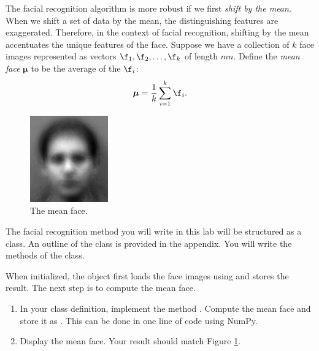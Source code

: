 The facial recognition algorithm is more robust if we first \emph{shift by the mean}. When we shift a set of data by the mean, the distinguishing features are exaggerated. Therefore, in the context of facial recognition, shifting by the mean accentuates the unique features of the face.
Suppose we have a collection of $k$ face images represented as vectors $\f_1, \f_2, \ldots, \f_k$ of length $mn$.
Define the \emph{mean face} ${\boldsymbol \mu}$ to be the average of the $\f_i$:
\[
{\boldsymbol \mu} = \frac{1}{k}\sum_{i=1}^k \f_i.
\]
\begin{figure}
\includegraphics[width=0.3\textwidth]{meanFace.png}
\caption{The mean face.}
\label{facialRecognition:meanFace}
\end{figure}

\begin{problem}
\label{prob:meanFace}
\leavevmode

The facial recognition method you will write in this lab will be structured as a class. 
An outline of the  class is provided in the appendix. %
You will write the methods of the class.

When initialized, the  object first loads the face images using  and stores the result.
The next step is to compute the mean face.
\begin{enumerate}
\item In your class definition, implement the method .
Compute the mean face and store it as .
This can be done in one line of code using NumPy.

\item Display the mean face.
Your result should match Figure \ref{facialRecognition:meanFace}.
\end{enumerate}
\end{problem}



